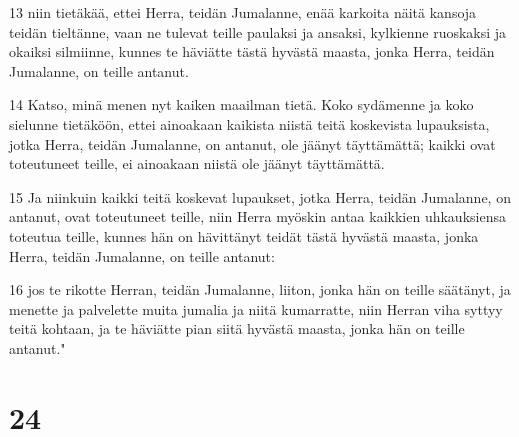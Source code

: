 \par 13 niin tietäkää, ettei Herra, teidän Jumalanne, enää karkoita näitä kansoja teidän tieltänne, vaan ne tulevat teille paulaksi ja ansaksi, kylkienne ruoskaksi ja okaiksi silmiinne, kunnes te häviätte tästä hyvästä maasta, jonka Herra, teidän Jumalanne, on teille antanut.
\par 14 Katso, minä menen nyt kaiken maailman tietä. Koko sydämenne ja koko sielunne tietäköön, ettei ainoakaan kaikista niistä teitä koskevista lupauksista, jotka Herra, teidän Jumalanne, on antanut, ole jäänyt täyttämättä; kaikki ovat toteutuneet teille, ei ainoakaan niistä ole jäänyt täyttämättä.
\par 15 Ja niinkuin kaikki teitä koskevat lupaukset, jotka Herra, teidän Jumalanne, on antanut, ovat toteutuneet teille, niin Herra myöskin antaa kaikkien uhkauksiensa toteutua teille, kunnes hän on hävittänyt teidät tästä hyvästä maasta, jonka Herra, teidän Jumalanne, on teille antanut:
\par 16 jos te rikotte Herran, teidän Jumalanne, liiton, jonka hän on teille säätänyt, ja menette ja palvelette muita jumalia ja niitä kumarratte, niin Herran viha syttyy teitä kohtaan, ja te häviätte pian siitä hyvästä maasta, jonka hän on teille antanut."

\chapter{24}

